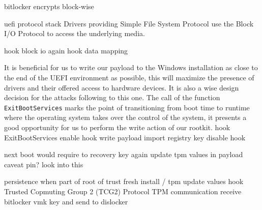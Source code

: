 bitlocker encrypts block-wise

uefi protocol stack
\cite[13.3.2 Partition Disocvery]{uefi-spec}
Drivers providing Simple File System Protocol use the Block I/O Protocol to access the underlying media.


hook block io
again hook data mapping

It is beneficial for us to write our payload to the Windows installation as close to the end of the UEFI environment as possible, this will maximize the presence of drivers and their offered access to hardware devices. It is also a wise design decision for the attacks following to this one. The call of the function \lstinline{ExitBootServices} marks the point of transitioning from boot time to runtime where the operating system takes over the control of the system, it presents a good opportunity for us to perform the write action of our rootkit.
\cite{exitbootservices-hooking}
hook ExitBootServices
enable hook
write payload
import registry key
disable hook

next boot would require to recovery key again
update tpm values in payload
caveat pin? look into this

persistence when part of root of trust
fresh install / tpm update values
hook Trusted Copmuting Group 2 (TCG2) Protocol
TPM communication
\cite[6.7.3]{tcg-efi-platform-spec}
receive bitlocker vmk key and send to dislocker

